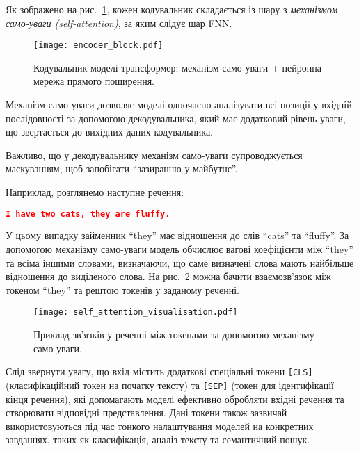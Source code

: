 Як зображено на рис.~\ref{fig:encoder_block}, кожен кодувальник складається із шару з \emph{механізмом само-уваги (self-attention)}, за яким слідує шар FNN.

\begin{figure}[h]
    \centering
    \texttt{[image: encoder\_block.pdf]}
    \caption{Кодувальник моделі трансформер: механізм само-уваги + нейронна мережа прямого поширення.}
    \label{fig:encoder_block}
\end{figure}

Механізм само-уваги дозволяє моделі одночасно аналізувати всі позиції у вхідній послідовності за допомогою декодувальника, який має додатковий рівень уваги, що звертається до вихідних даних кодувальника.

Важливо, що у декодувальнику механізм само-уваги супроводжується маскуванням, щоб запобігати ``зазиранню у майбутнє''.

Наприклад, розглянемо наступне речення:
\begin{lstlisting}[language=json, breaklines=true]
I have two cats, they are fluffy.
\end{lstlisting}

У цьому випадку займенник ``they'' має відношення до слів ``cats'' та ``fluffy''. За допомогою механізму само-уваги модель обчислює вагові коефіцієнти між ``they'' та всіма іншими словами, визначаючи, що саме визначені слова мають найбільше відношення до виділеного слова. На рис.~\ref{fig:self_attention_visualisation} можна бачити взаємозв’язок між токеном ``they'' та рештою токенів у заданому реченні.

\begin{figure}[h]
    \centering
    \texttt{[image: self\_attention\_visualisation.pdf]}
    \caption{Приклад зв'язків у реченні між токенами за допомогою механізму само-уваги.}
    \label{fig:self_attention_visualisation}
\end{figure}

Слід звернути увагу, що вхід містить додаткові спеціальні токени \texttt{[CLS]} (класифікаційний токен на початку тексту) та \texttt{[SEP]} (токен для ідентифікації кінця речення), які допомагають моделі ефективно обробляти вхідні речення та створювати відповідні представлення. Дані токени також зазвичай використовуються під час тонкого налаштування моделей на конкретних завданнях, таких як класифікація, аналіз тексту та семантичний пошук.

